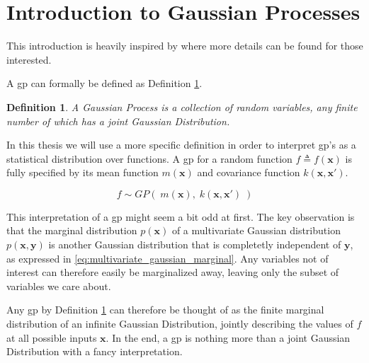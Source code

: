 \section{Introduction to Gaussian Processes}

This introduction is heavily inspired by \cite{rasmussen} where more details can be found for those interested. 

A \acrfull{gp} can formally be defined as Definition \ref{def:gp}.

\newtheorem{gp_def}{Definition}
\begin{gp_def}\label{def:gp}
A Gaussian Process is a collection of random variables, any finite number of which has a joint Gaussian Distribution.
\end{gp_def}

In this thesis we will use a more specific definition in order to interpret \acrshort{gp}'s as a statistical distribution over functions. A \acrshort{gp} for a random function $f \triangleq f(\boldsymbol{x})$ is fully specified by its mean function $m(\boldsymbol{x})$ and covariance function $k(\boldsymbol{x}, \boldsymbol{x}')$.

\begin{equation}\label{eq:gp}
    f \sim GP(\;m(\boldsymbol{x}), \; k(\boldsymbol{x}, \boldsymbol{x}')\;)
\end{equation}

This interpretation of a \acrshort{gp} might seem a bit odd at first. The key observation is that the marginal distribution $p(\boldsymbol{x})$ of a multivariate Gaussian distribution $p(\boldsymbol{x}, \boldsymbol{y})$ is another Gaussian distribution that is completetly independent of $\boldsymbol{y}$, as expressed in \cref{eq:multivariate_gaussian_marginal}. Any variables not of interest can therefore easily be marginalized away, leaving only the subset of variables we care about.

Any \acrshort{gp} by Definition \ref{def:gp} can therefore be thought of as the finite marginal distribution of an infinite Gaussian Distribution, jointly describing the values of $f$ at all possible inputs $\boldsymbol{x}$. In the end, a \acrshort{gp} is nothing more than a joint Gaussian Distribution with a fancy interpretation.

